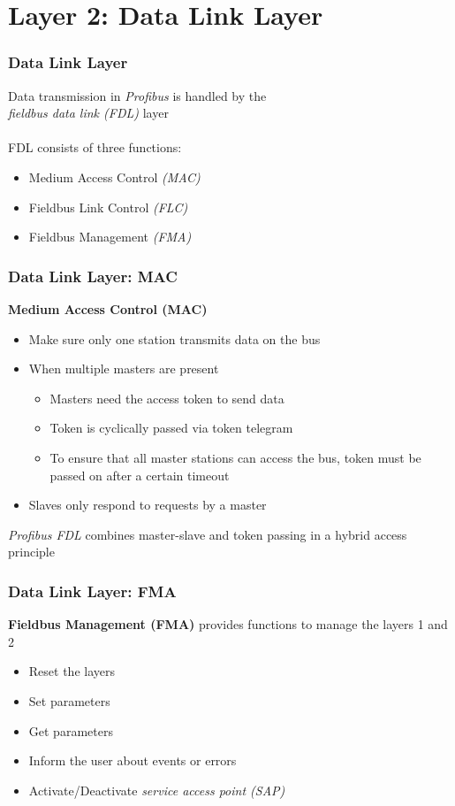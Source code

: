 \documentclass{beamer}
\begin{document}
\section{Layer 2: Data Link Layer}
\begin{frame}
  \frametitle{Data Link Layer}
  Data transmission in \textit{Profibus} is handled by the \\
  \textit{fieldbus data link (FDL)} layer \\
  \hfill \\
  FDL consists of three functions:
  \begin{itemize}
    \item Medium Access Control \textit{(MAC)}
    \item Fieldbus Link Control \textit{(FLC)}
    \item Fieldbus Management \textit{(FMA)}
  \end{itemize}
\end{frame}

\begin{frame}
  \frametitle{Data Link Layer: MAC}
  \textbf{Medium Access Control (MAC)}
  \begin{itemize}
    \item Make sure only one station transmits data on the bus
    \item When multiple masters are present
      \begin{itemize}
        \item Masters need the access token to send data
        \item Token is cyclically passed via token telegram
        \item To ensure that all master stations can access the bus, token must be passed
          on after a certain timeout
      \end{itemize}
    \item Slaves only respond to requests by a master
  \end{itemize}
  \textit{Profibus FDL} combines master-slave and token passing in a hybrid access principle
\end{frame}

\begin{frame}
  \frametitle{Data Link Layer: FMA}
  \textbf{Fieldbus Management (FMA)} provides functions to manage the layers 1 and 2
    \begin{itemize}
      \item Reset the layers
      \item Set parameters
      \item Get parameters
      \item Inform the user about events or errors
      \item Activate/Deactivate \textit{service access point (SAP)}
    \end{itemize}
\end{frame}
\end{document}
